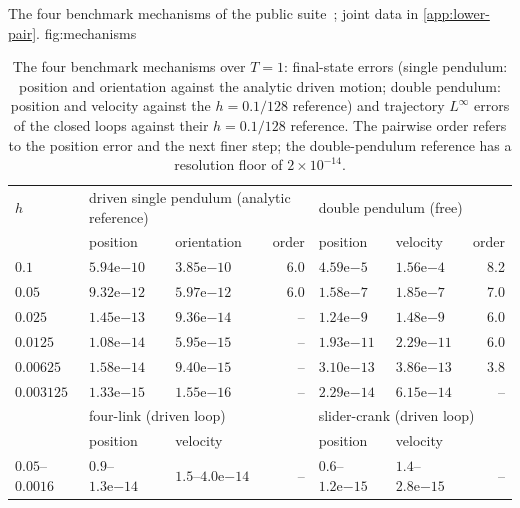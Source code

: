 {The four benchmark mechanisms of the public suite~\cite{kissel2022absolute}; joint data in
\ref{app:lower-pair}.}
{fig:mechanisms}

\begin{table}[!htb]
\centering
\caption{The four benchmark mechanisms over $T=1$: final-state errors (single pendulum: position and
orientation against the analytic driven motion; double pendulum: position and velocity against the
$h=0.1/128$ reference)
and trajectory $L^\infty$ errors of the closed loops against their $h=0.1/128$ reference. The
pairwise order refers to the position error and the next finer step; the double-pendulum reference
has a resolution floor of $2\times10^{-14}$.}
\label{tab:e4}
\scriptsize
\setlength{\tabcolsep}{3pt}
\begin{tabular}{@{}lllrllr@{}}
\toprule
$h$ & \multicolumn{3}{l}{driven single pendulum (analytic reference)} & \multicolumn{3}{l}{double pendulum (free)} \\
    & position & orientation & order & position & velocity & order \\
\midrule
$0.1$ & $5.94\mathrm{e}{-10}$ & $3.85\mathrm{e}{-10}$ & 6.0 & $4.59\mathrm{e}{-5}$  & $1.56\mathrm{e}{-4}$  & 8.2 \\
$0.05$ & $9.32\mathrm{e}{-12}$ & $5.97\mathrm{e}{-12}$ & 6.0 & $1.58\mathrm{e}{-7}$  & $1.85\mathrm{e}{-7}$  & 7.0 \\
$0.025$ & $1.45\mathrm{e}{-13}$ & $9.36\mathrm{e}{-14}$ & -- & $1.24\mathrm{e}{-9}$  & $1.48\mathrm{e}{-9}$  & 6.0 \\
$0.0125$ & $1.08\mathrm{e}{-14}$ & $5.95\mathrm{e}{-15}$ & -- & $1.93\mathrm{e}{-11}$ & $2.29\mathrm{e}{-11}$ & 6.0 \\
$0.00625$ & $1.58\mathrm{e}{-14}$ & $9.40\mathrm{e}{-15}$ & -- & $3.10\mathrm{e}{-13}$ & $3.86\mathrm{e}{-13}$ & 3.8 \\
$0.003125$ & $1.33\mathrm{e}{-15}$ & $1.55\mathrm{e}{-16}$ & -- & $2.29\mathrm{e}{-14}$ & $6.15\mathrm{e}{-14}$ & -- \\
\midrule
 & \multicolumn{3}{l}{four-link (driven loop)} & \multicolumn{3}{l}{slider-crank (driven loop)} \\
 & position & velocity & & position & velocity & \\
\midrule
$0.05$--$0.0016$ & $0.9$--$1.3\mathrm{e}{-14}$ & $1.5$--$4.0\mathrm{e}{-14}$ & -- & $0.6$--$1.2\mathrm{e}{-15}$ & $1.4$--$2.8\mathrm{e}{-15}$ & -- \\
\bottomrule
\end{tabular}
\end{table}


